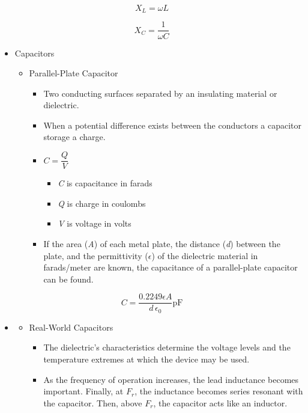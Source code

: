 \begin{equation}
X_L = \omega L
\end{equation}

\begin{equation}
X_C = \dfrac{1}{\omega C}
\end{equation}

\begin{itemize}
	\item Capacitors
	\begin{itemize}
		\item Parallel-Plate Capacitor
		\begin{itemize}
			\item Two conducting surfaces separated by an insulating material or dielectric.
			\item When a potential difference exists between the conductors a capacitor storage a charge. 
			\item[] $C = \dfrac{Q}{V}$
			\begin{itemize}
				\item \textit{C} is capacitance in farads
				\item \textit{Q} is charge in coulombs
				\item \textit{V} is voltage in volts
			\end{itemize}
		\item If the area (\textit{A}) of each metal plate, the distance
		(\textit{d}) between the plate, and the permittivity ($\epsilon$) of the dielectric material in farads/meter are known, the capacitance of a
		parallel-plate capacitor can be found.
		\end{itemize}
	\end{itemize}
\end{itemize}

\begin{equation}
C = \dfrac{0.2249 \epsilon A}{d \,\epsilon_0} \si{\pico\farad}
\end{equation}

\begin{itemize}
	\item[]	
	\begin{itemize}
		\item Real-World Capacitors
		\begin{itemize}
			\item The dielectric’s characteristics determine the voltage levels and the temperature extremes at	which the device may be used.
			\item As the frequency of operation increases, the lead
			inductance becomes important. Finally, at $F_r$, the inductance
			becomes series resonant with the capacitor. Then, above $F_r$, the
			capacitor acts like an inductor.
		\end{itemize}
	\end{itemize}
\end{itemize}

